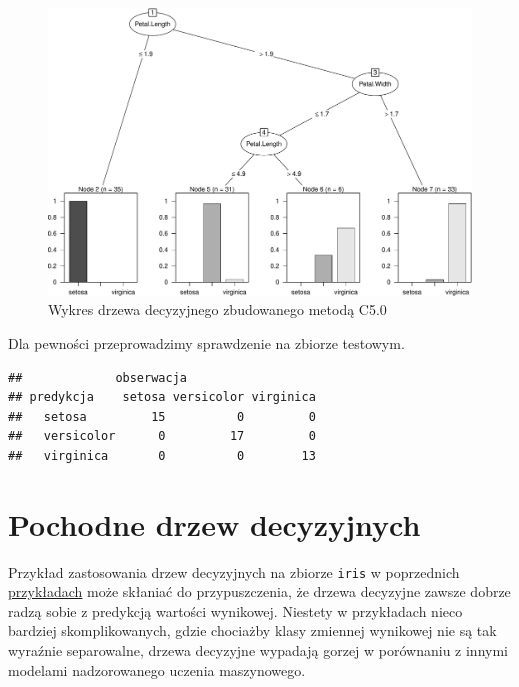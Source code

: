 \documentclass[
]{book}
\newenvironment{Shaded}{\begin{snugshade}}{\end{snugshade}}
\newcommand{\AttributeTok}[1]{\textcolor[rgb]{0.13,0.29,0.53}{#1}}
\newcommand{\FunctionTok}[1]{\textcolor[rgb]{0.13,0.29,0.53}{\textbf{#1}}}
\newcommand{\NormalTok}[1]{#1}
\newcommand{\OtherTok}[1]{\textcolor[rgb]{0.56,0.35,0.01}{#1}}
\newcommand{\SpecialCharTok}[1]{\textcolor[rgb]{0.81,0.36,0.00}{\textbf{#1}}}
\theoremstyle{plain}
\theoremstyle{definition}
\theoremstyle{definition}
\theoremstyle{definition}
\theoremstyle{definition}
\theoremstyle{definition}
\theoremstyle{remark}
\begin{document}
\begin{figure}
\centering
\includegraphics{EksploracjaDanych_files/figure-latex/C50-1.pdf}
\caption{\label{fig:C50}Wykres drzewa decyzyjnego zbudowanego metodą C5.0}
\end{figure}

Dla pewności przeprowadzimy sprawdzenie na zbiorze testowym.

\begin{Shaded}
\end{Shaded}

\begin{verbatim}
##             obserwacja
## predykcja    setosa versicolor virginica
##   setosa         15          0         0
##   versicolor      0         17         0
##   virginica       0          0        13
\end{verbatim}

\chapter{Pochodne drzew decyzyjnych}\label{pochodne-drzew-decyzyjnych}

Przykład zastosowania drzew decyzyjnych na zbiorze \texttt{iris} w poprzednich \hyperref[przyk41]{przykładach} może skłaniać do przypuszczenia, że drzewa decyzyjne zawsze dobrze radzą sobie z predykcją wartości wynikowej. Niestety w przykładach nieco bardziej skomplikowanych, gdzie chociażby klasy zmiennej wynikowej nie są tak wyraźnie separowalne, drzewa decyzyjne wypadają gorzej w porównaniu z innymi modelami nadzorowanego uczenia maszynowego.
\end{document}
